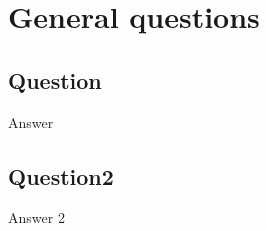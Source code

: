 \newpage

\section*{General questions}

\subsection*{Question}
Answer


\subsection*{Question2}
Answer 2

